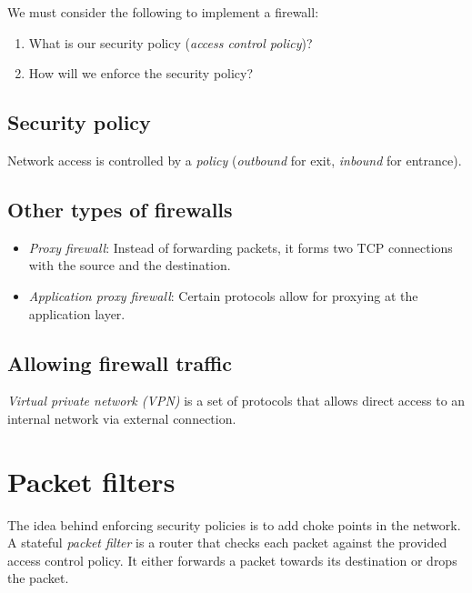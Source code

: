 \medskip
We must consider the following to implement a firewall:
\begin{enumerate}
    \item What is our security policy (\emph{access control policy})?
    \item How will we enforce the security policy?
\end{enumerate}

\subsection{Security policy}
Network access is controlled by a \emph{policy} (\emph{outbound} for exit, \emph{inbound} for entrance).

\subsection{Other types of firewalls}
\begin{itemize}
    \item \emph{Proxy firewall}: Instead of forwarding packets, it forms two TCP connections with the source and the destination.
    
    \item \emph{Application proxy firewall}: Certain protocols allow for proxying at the application layer.
\end{itemize}

\subsection{Allowing firewall traffic}
\emph{Virtual private network (VPN)} is a set of protocols that allows direct access to an internal network via external connection.

\section{Packet filters}
The idea behind enforcing security policies is to add choke points in the network. A stateful \emph{packet filter} is a router that checks each packet against the provided access control policy. It either forwards a packet towards its destination or drops the packet.

